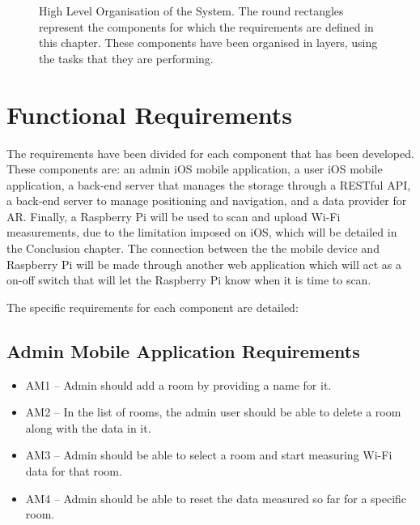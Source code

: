 \begin{figure}[H]
    \centering
    \caption{High Level Organisation of the System. The round rectangles represent the components for which the requirements are defined in this chapter. These components have been organised in layers, using the tasks that they are performing.}
    \label{fig:high-level-organisation}
\end{figure}

\newpage
\section{Functional Requirements}
\label{sec:requirements}
The requirements have been divided for each component that has been developed. These components are: an admin iOS mobile application, a user iOS mobile application, a back-end server that manages the storage through a RESTful API, a back-end server to manage positioning and navigation, and a data provider for AR. Finally, a Raspberry Pi will be used to scan and upload Wi-Fi measurements, due to the limitation imposed on iOS, which will be detailed in the Conclusion chapter. The connection between the the mobile device and Raspberry Pi will be made through another web application which will act as a on-off switch that will let the Raspberry Pi know when it is time to scan.

The specific requirements for each component are detailed:

\subsection{Admin Mobile Application Requirements}
\label{sec:admin-requirements}
\begin{itemize}
    \item AM1 – Admin should add a room by providing a name for it. 
    \item AM2 – In the list of rooms, the admin user should be able to delete a room along with the data in it.
    \item AM3 – Admin should be able to select a room and start measuring Wi-Fi data for that room.
    \item AM4 – Admin should be able to reset the data measured so far for a specific room.
\end{itemize}

